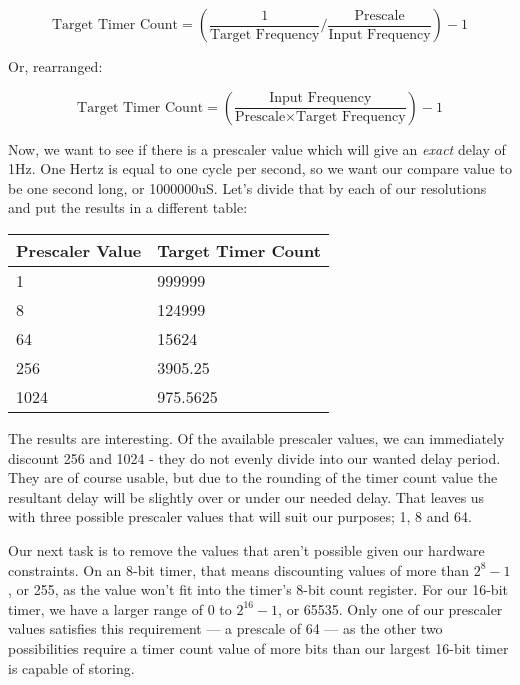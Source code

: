 \documentclass[a4paper,oneside,notitlepage]{book}
\begin{document}
\begin{displaymath}
\text{Target Timer Count} = (\frac{1}{\text{Target Frequency}} / \frac{\text{Prescale}}{\text{Input Frequency}}) - 1
\end{displaymath}

Or, rearranged:

\begin{displaymath}
\text{Target Timer Count} = (\frac{\text{Input Frequency}}{\text{Prescale} \times \text{Target Frequency}}) - 1
\end{displaymath}

Now, we want to see if there is a prescaler value which will give an \textit{exact} delay of 1Hz. One Hertz is equal to one cycle per second, so we want our compare value to be one second long, or 1000000uS. Let's divide that by each of our resolutions and put the results in a different table:

\begin{center}
\begin{tabular}{|l|l|}
	\hline
	Prescaler Value & Target Timer Count \\
	\hline
	1    & 999999   \\
	8    & 124999   \\
	64   & 15624    \\
	256  & 3905.25  \\
	1024 & 975.5625 \\
	\hline
\end{tabular}
\end{center}

The results are interesting. Of the available prescaler values, we can immediately discount 256 and 1024 - they do not evenly divide into our wanted delay period. They are of course usable, but due to the rounding of the timer count value the resultant delay will be slightly over or under our needed delay. That leaves us with three possible prescaler values that will suit our purposes; 1, 8 and 64.

Our next task is to remove the values that aren't possible given our hardware constraints. On an 8-bit timer, that means discounting values of more than \(2^{8}-1\), or 255, as the value won't fit into the timer's 8-bit count register. For our 16-bit timer, we have a larger range of 0 to \(2^{16}-1\), or 65535. Only one of our prescaler values satisfies this requirement --- a prescale of 64 --- as the other two possibilities require a timer count value of more bits than our largest 16-bit timer is capable of storing.
\end{document}
